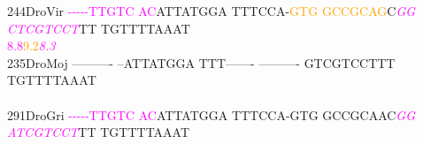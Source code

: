 \documentclass[11pt,twoside,reqno,a4paper]{article}
\begin{document}
{244\hspace*{1\charwidth}DroVir	\textcolor{magenta}{-}\textcolor{magenta}{-}\textcolor{magenta}{-}\textcolor{magenta}{-}\textcolor{magenta}{-}\textcolor{magenta}{T}\textcolor{magenta}{T}\textcolor{magenta}{G}\textcolor{magenta}{T}\textcolor{magenta}{C}	\textcolor{magenta}{A}\textcolor{magenta}{C}ATTATGGA	TTTCCA-\textcolor{orange}{G}\textcolor{orange}{T}\textcolor{orange}{G}	\textcolor{orange}{G}\textcolor{orange}{C}\textcolor{orange}{C}\textcolor{orange}{G}\textcolor{orange}{C}\textcolor{orange}{A}\textcolor{orange}{G}C\textit{\textcolor{magenta}{G}}\textit{\textcolor{magenta}{G}}	\textit{\textcolor{magenta}{C}}\textit{\textcolor{magenta}{T}}\textit{\textcolor{magenta}{C}}\textit{\textcolor{magenta}{G}}\textit{\textcolor{magenta}{T}}\textit{\textcolor{magenta}{C}}\textit{\textcolor{magenta}{C}}\textit{\textcolor{magenta}{T}}TT	TGTTTTAAAT	\\
\hspace*{4\charwidth}\hspace*{7\charwidth}\hspace*{0\charwidth}\textcolor{magenta}{8.8}\hspace*{1\charwidth}\hspace*{1\charwidth}\hspace*{24\charwidth}\textcolor{orange}{9.2}\hspace*{1\charwidth}\hspace*{8\charwidth}\textit{\textcolor{magenta}{8.3}}\hspace*{1\charwidth}\hspace*{1\charwidth}\hspace*{1\charwidth}\\
235\hspace*{1\charwidth}DroMoj	----------	--ATTATGGA	TTT-------	----------	GTCGTCCTTT	TGTTTTAAAT	\\
\hspace*{4\charwidth}\hspace*{7\charwidth}\hspace*{1\charwidth}\hspace*{1\charwidth}\hspace*{1\charwidth}\hspace*{1\charwidth}\hspace*{1\charwidth}\hspace*{1\charwidth}\\
291\hspace*{1\charwidth}DroGri	\textcolor{magenta}{-}\textcolor{magenta}{-}\textcolor{magenta}{-}\textcolor{magenta}{-}\textcolor{magenta}{-}\textcolor{magenta}{T}\textcolor{magenta}{T}\textcolor{magenta}{G}\textcolor{magenta}{T}\textcolor{magenta}{C}	\textcolor{magenta}{A}\textcolor{magenta}{C}ATTATGGA	TTTCCA-GTG	GCCGCAAC\textit{\textcolor{magenta}{G}}\textit{\textcolor{magenta}{G}}	\textit{\textcolor{magenta}{A}}\textit{\textcolor{magenta}{T}}\textit{\textcolor{magenta}{C}}\textit{\textcolor{magenta}{G}}\textit{\textcolor{magenta}{T}}\textit{\textcolor{magenta}{C}}\textit{\textcolor{magenta}{C}}\textit{\textcolor{magenta}{T}}TT	TGTTTTAAAT	\\
}
\end{document}

